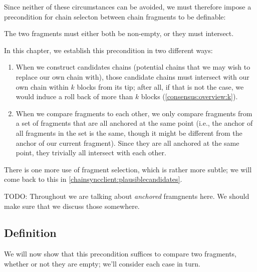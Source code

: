 Since neither of these circumstances can be avoided, we must therefore impose a
precondition for chain selecton between chain fragments to be definable:

\begin{definition}
The two fragments must either both be non-empty, or they must intersect.
\end{definition}

In this chapter, we establish this precondition in two different ways:

\begin{enumerate}
\item When we construct candidates chains (potential chains that we may wish
to replace our own chain with), those candidate chains must intersect with
our own chain within $k$ blocks from its tip; after all, if that is not the
case, we would induce a roll back of more than $k$ blocks
(\cref{consensus:overview:k}).

\item When we compare fragments to each other, we only compare fragments from a
set of fragments that are all anchored at the same point (i.e., the anchor of
all fragments in the set is the same, though it might be different from the
anchor of our current fragment). Since they are all anchored at the same point,
they trivially all intersect with each other.
\end{enumerate}

There is one more use of fragment selection, which is rather more subtle;
we will come back to this in \cref{chainsyncclient:plausiblecandidates}.

 TODO: Throughout we are talking about \emph{anchored} framgnents
here. We should make sure that we discuss those somewhere.

\subsection{Definition}
\label{chainsel:fragments:definition}

We will now show that this precondition suffices to compare two fragments,
whether or not they are empty; we'll consider each case in turn.

